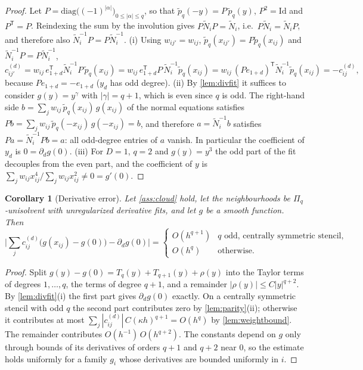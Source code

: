 \documentclass[11pt,a4paper]{article}
\theoremstyle{plain}
\newtheorem{corollary}[theorem]{Corollary}
\theoremstyle{definition}
\theoremstyle{remark}
\numberwithin{equation}{section}
\newcommand{\ptil}{\tilde p}
\newcommand{\Ntil}{\tilde N}
\begin{document}
\begin{proof}
Let $P=\mathrm{diag}\big((-1)^{|\alpha|}\big)_{0\le|\alpha|\le q}$, so that $\ptil_q(-y)=P\,\ptil_q(y)$, $P^2=\mathrm{Id}$ and $P^{\mathsf T}=P$. Reindexing the sum by the involution gives $P\Ntil_iP=\Ntil_i$, i.e.\ $P\Ntil_i=\Ntil_iP$, and therefore also $\Ntil_i^{-1}P=P\Ntil_i^{-1}$.
(i) Using $w_{ij'}=w_{ij}$, $\ptil_q(x_{ij'})=P\ptil_q(x_{ij})$ and $\Ntil_i^{-1}P=P\Ntil_i^{-1}$,
\[
c^{(d)}_{ij'}=w_{ij}\,e_{1+d}^{\mathsf T}\Ntil_i^{-1}P\,\ptil_q(x_{ij})=w_{ij}\,e_{1+d}^{\mathsf T}P\,\Ntil_i^{-1}\ptil_q(x_{ij})=w_{ij}\,(Pe_{1+d})^{\mathsf T}\Ntil_i^{-1}\ptil_q(x_{ij})=-c^{(d)}_{ij},
\]
because $Pe_{1+d}=-e_{1+d}$ ($y_d$ has odd degree).
(ii) By \cref{lem:divfit} it suffices to consider $g(y)=y^\gamma$ with $|\gamma|=q+1$, which is even since $q$ is odd. The right-hand side $b=\sum_j w_{ij}\,\ptil_q(x_{ij})\,g(x_{ij})$ of the normal equations satisfies $Pb=\sum_j w_{ij}\,\ptil_q(-x_{ij})\,g(-x_{ij})=b$, and therefore $a=\Ntil_i^{-1}b$ satisfies $Pa=\Ntil_i^{-1}Pb=a$: all odd-degree entries of $a$ vanish. In particular the coefficient of $y_d$ is $0=\partial_d g(0)$.
(iii) For $D=1$, $q=2$ and $g(y)=y^3$ the odd part of the fit decouples from the even part, and the coefficient of $y$ is $\sum_j w_{ij}x_{ij}^4/\sum_j w_{ij}x_{ij}^2\ne0=g'(0)$.
\end{proof}

\begin{corollary}[Derivative error]\label{cor:derr}
Let \cref{ass:cloud} hold, let the neighbourhoods be $\Pi_q$-unisolvent with unregularized derivative fits, and let $g$ be a smooth function. Then
\begin{equation}\label{eq:derr}
\Big|\sum_j c^{(d)}_{ij}\big(g(x_{ij})-g(0)\big)-\partial_d g(0)\Big| =
\begin{cases} O(h^{q+1}) & \text{$q$ odd, centrally symmetric stencil},\\ O(h^{q}) & \text{otherwise.}\end{cases}
\end{equation}
\end{corollary}

\begin{proof}
Split $g(y)-g(0)=T_q(y)+T_{q+1}(y)+\rho(y)$ into the Taylor terms of degrees $1,\dots,q$, the terms of degree $q+1$, and a remainder $|\rho(y)|\le C|y|^{q+2}$. By \cref{lem:divfit}(i) the first part gives $\partial_dg(0)$ exactly. On a centrally symmetric stencil with odd $q$ the second part contributes zero by \cref{lem:parity}(ii); otherwise it contributes at most $\sum_j|c^{(d)}_{ij}|\,C(\kappa h)^{q+1}=O(h^q)$ by \cref{lem:weightbound}. The remainder contributes $O(h^{-1})\,O(h^{q+2})$. The constants depend on $g$ only through bounds of its derivatives of orders $q+1$ and $q+2$ near $0$, so the estimate holds uniformly for a family $g_i$ whose derivatives are bounded uniformly in $i$.
\end{proof}
\end{document}
